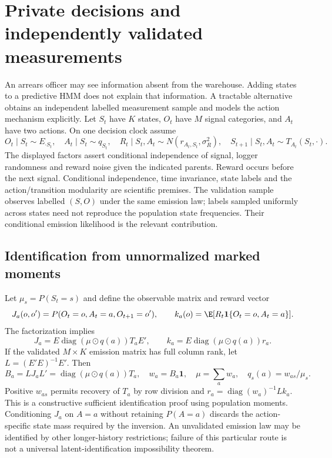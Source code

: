 \section{Private decisions and independently validated measurements}
\label{s5:private-logger}
An arrears officer may see information absent from the warehouse. Adding
states to a predictive HMM does not explain that information. A tractable
alternative obtains an independent labelled measurement sample and models
the action mechanism explicitly. Let $S_t$ have $K$ states, $O_t$ have $M$
signal categories, and $A_t$ have two actions. On one decision clock assume
\[
 O_t\mid S_t\sim E_{\cdot S_t},\quad
 A_t\mid S_t\sim q_{S_t},\quad
 R_t\mid S_t,A_t\sim N(r_{A_t,S_t},\sigma_R^2),\quad
 S_{t+1}\mid S_t,A_t\sim T_{A_t}(S_t,\cdot).
\]
The displayed factors assert conditional independence of signal, logger
randomness and reward noise given the indicated parents. Reward occurs before
the next signal. Conditional independence, time invariance, state labels and
the action/transition modularity are scientific premises. The validation
sample observes labelled $(S,O)$ under the same emission law; labels sampled
uniformly across states need not reproduce the population state frequencies.
Their conditional emission likelihood is the relevant contribution.

\subsection{Identification from unnormalized marked moments}
Let $\mu_s=P(S_t=s)$ and define the observable matrix and reward vector
\[
 J_a(o,o')=P(O_t=o,A_t=a,O_{t+1}=o'),\qquad
 k_a(o)=\E[R_t\mathbf1\{O_t=o,A_t=a\}].
\]
The factorization implies
\[
 J_a=E\operatorname{diag}(\mu\odot q(a))T_aE',\qquad
 k_a=E\operatorname{diag}(\mu\odot q(a))r_a.
\]
If the validated $M\times K$ emission matrix has full column rank, let
$L=(E'E)^{-1}E'$. Then
\begin{equation}
 B_a=LJ_aL'=\operatorname{diag}(\mu\odot q(a))T_a,
 \quad w_a=B_a\mathbf1,\quad
 \mu=\sum_a w_a,\quad q_s(a)=w_{as}/\mu_s.
 \label{s5:marked-identification}
\end{equation}
Positive $w_{as}$ permits recovery of $T_a$ by row division and
$r_a=\operatorname{diag}(w_a)^{-1}Lk_a$. This is a constructive sufficient
identification proof using population moments. Conditioning $J_a$ on $A=a$
without retaining $P(A=a)$ discards the action-specific state mass required
by the inversion. An unvalidated emission law may be identified by other
longer-history restrictions; failure of this particular route is not a
universal latent-identification impossibility theorem.

